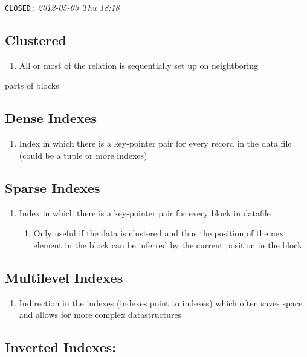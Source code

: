 \documentclass[11pt]{article}
\begin{document}
  \texttt{CLOSED:} \textit{2012-05-03 Thu 18:18}\newline
\subsection{Clustered}
\label{sec-8.1}

\begin{enumerate}
\item All or most of the relation is sequentially set up on neightboring
\end{enumerate}
   parts of blocks
\subsection{Dense Indexes}
\label{sec-8.2}

\begin{enumerate}
\item Index in which there is a key-pointer pair for every record in
      the data file (could be a tuple or more indexes)
\end{enumerate}
\subsection{Sparse Indexes}
\label{sec-8.3}

\begin{enumerate}
\item Index in which there is a key-pointer pair for every block in datafile

\begin{enumerate}
\item Only useful if the data is clustered and thus the position of
         the next element in the block can be inferred by the current position
         in the block
\end{enumerate}

\end{enumerate}
\subsection{Multilevel Indexes}
\label{sec-8.4}

\begin{enumerate}
\item Indirection in the indexes (indexes point to indexes) which often saves space and allows
      for more complex datastructures
\end{enumerate}
\subsection{Inverted Indexes:}
\label{sec-8.5}
\end{document}
